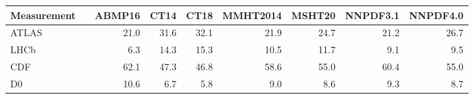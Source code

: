\begin{tabular}{l@{\extracolsep{\fill}}rrrrrrrr}
  \hline \hline
Measurement                     &  &  ABMP16  &      CT14  &      CT18  &  MMHT2014  &    MSHT20  &   NNPDF3.1  &   NNPDF4.0 \\
\hline 
                          ATLAS  &    &    21.0  &    31.6  &    32.1  &    21.9  &    24.7  &    21.2  &    26.7 \\
                          LHCb   &    &     6.3  &    14.3  &    15.3  &    10.5  &    11.7  &     9.1  &     9.5 \\
                          CDF    & &    62.1  &    47.3  &    46.8  &    58.6  &    55.0  &    60.4  &    55.0 \\
                          D0     & &    10.6  &     6.7  &     5.8  &     9.0  &     8.6  &     9.3  &     8.7 \\
\hline \hline 
\end{tabular}

